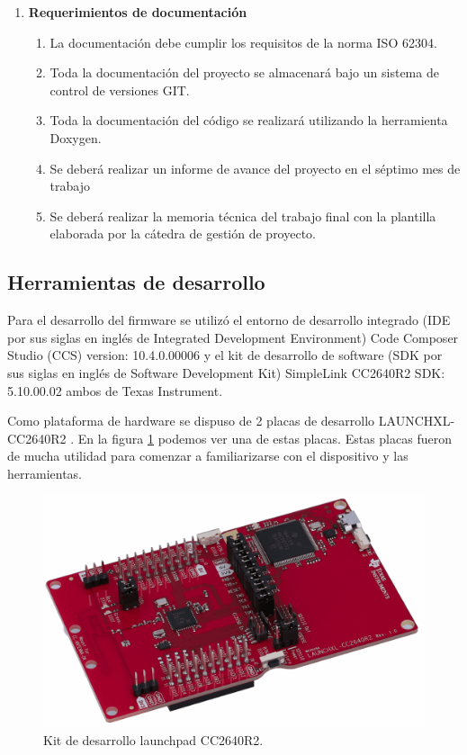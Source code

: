 \begin{enumerate}
\begin{enumerate}
		\end{enumerate}
	\item \textbf{Requerimientos de documentación}
		\begin{enumerate}
			\item La documentación debe cumplir los requisitos de la norma ISO 62304.
			\item Toda la documentación del proyecto se almacenará bajo un sistema de control de versiones GIT.
			\item Toda la documentación del código se realizará utilizando la herramienta Doxygen.
			\item Se deberá realizar un informe de avance del proyecto en el séptimo mes de trabajo
			\item Se deberá realizar la memoria técnica del trabajo final con la plantilla elaborada por la cátedra de gestión de proyecto.
		\end{enumerate}
			
\end{enumerate}

\subsection{Herramientas de desarrollo}
Para el desarrollo del firmware se utilizó el entorno de desarrollo integrado (IDE por sus siglas en inglés de Integrated Development Environment) Code Composer Studio (CCS) version: 10.4.0.00006 y el kit de desarrollo de software (SDK por sus siglas en inglés de Software Development Kit) SimpleLink CC2640R2 SDK: 5.10.00.02 ambos de Texas Instrument. 

Como plataforma de hardware se dispuso de 2 placas de desarrollo LAUNCHXL-CC2640R2 \citep{PART:LAUNCHXL}. En la figura \ref{fig:kitDesarrolloCC2640R2} podemos ver una de estas placas. Estas placas fueron de mucha utilidad para comenzar a familiarizarse con el dispositivo y las herramientas.

\vspace{1cm}

\begin{figure}[htbp]
	\centering
	\includegraphics[width=.6\textwidth]{./Figures/LaunchpadCC2640R2.png}
	\caption{Kit de desarrollo launchpad CC2640R2.}
	\label{fig:kitDesarrolloCC2640R2}
\end{figure}

